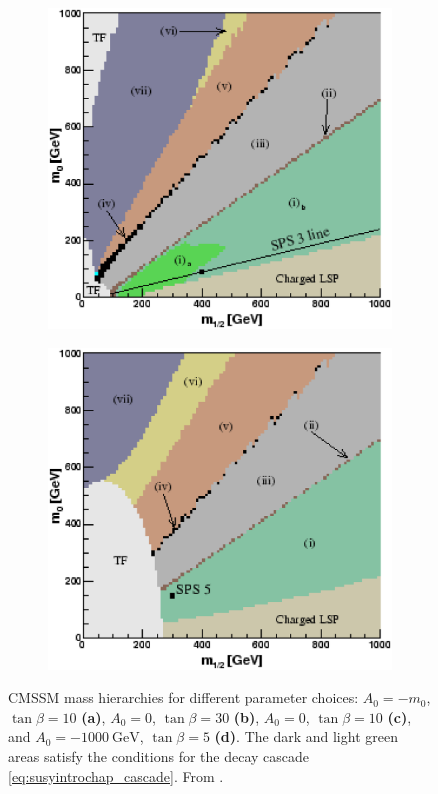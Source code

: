 \documentclass[twoside,english]{uiofysmaster}
\begin{document}
\begin{figure}[hbt]
\begin{subfigure}[b]{0.4\textwidth}
	\includegraphics[width=1\textwidth]{figures/susyintro/scan_sps3.eps}
	\caption{ }
	\label{fig:mSUGRA_decay_spectrum_c}
\end{subfigure}
\begin{subfigure}[b]{0.4\textwidth}
	\includegraphics[width=1\textwidth]{figures/susyintro/scan_sps5.eps}
	\caption{ }
	\label{fig:mSUGRA_decay_spectrum_d}
\end{subfigure}
\caption{CMSSM mass hierarchies for different parameter choices: $A_0 = -m_0$, $\tan\beta = 10$ {\bf (a)}, $A_0 = 0$, $\tan\beta = 30$ {\bf (b)}, $A_0 = 0$, $\tan\beta = 10$ {\bf (c)}, and $A_0 = -1000~\mathrm{GeV}$, $\tan\beta = 5$ {\bf (d)}. The dark and light green areas satisfy the conditions for the decay cascade \eqref{eq:susyintrochap_cascade}. From \cite{Gjelsten:2004ki}.}
\label{fig:mSUGRA_decay_spectrum}
\end{figure}
\end{document}
